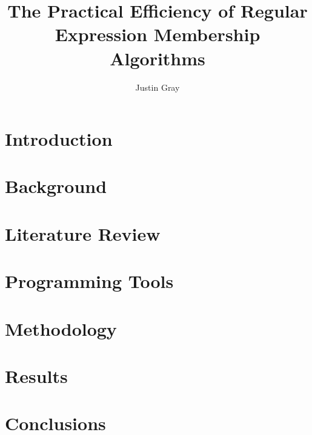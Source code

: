 \documentclass[11pt]{report}
\author{Justin Gray}
\title{The Practical Efficiency of Regular Expression Membership Algorithms}
\begin{document}
  
  
  
  {\singlespacing \tableofcontents}

  \chapter{Introduction}
  \label{ch:Introduction}
  
  
  \chapter{Background}
  \label{ch:Background}
  

  \chapter{Literature Review}
  \label{ch:Literature Review}
  
  
  \chapter{Programming Tools}
  \label{ch:Programming Tools}
  
  
  \chapter{Methodology}
  \label{ch:Methodology}
  
  
  \chapter{Results}
  \label{ch:Results}
  
  
  \chapter{Conclusions}
  \label{ch:Conclusions}
  
  
  \printbibliography[title=References]
  
\end{document}
